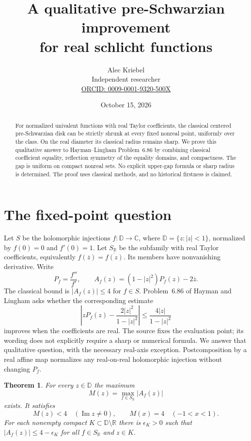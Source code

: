\documentclass[11pt]{article}
\title{A qualitative pre-Schwarzian improvement\protect\\ for real schlicht functions}
\author{Alec Kriebel\\\small Independent researcher\\
\small\href{https://orcid.org/0009-0001-9320-500X}{ORCID: 0009-0001-9320-500X}}
\date{October 15, 2026}
\newtheorem{theorem}{Theorem}
\newcommand{\D}{\mathbb D}
\newcommand{\SR}{S_{\mathbb R}}
\newcommand{\cl}[1]{\overline{#1}}
\DeclareMathOperator{\Impart}{Im}
\begin{document}
\maketitle
\begin{abstract}
For normalized univalent functions with real Taylor coefficients, the classical
centered pre-Schwarzian disk can be strictly shrunk at every fixed nonreal point,
uniformly over the class. On the real diameter its classical radius remains
sharp. We prove this qualitative answer to Hayman--Lingham Problem~6.86 by
combining classical coefficient equality, reflection symmetry of the equality
domains, and compactness. The gap is uniform on compact nonreal sets. No explicit
upper-gap formula or sharp radius is determined. The proof uses classical
methods, and no historical firstness is claimed.
\end{abstract}

\section{The fixed-point question}
Let $S$ be the holomorphic injections $f:\D\to\mathbb C$, where
$\D=\{z:|z|<1\}$, normalized by $f(0)=0$ and $f'(0)=1$.
Let $\SR$ be the subfamily with real Taylor coefficients, equivalently
$f(\cl z)=\cl{f(z)}$. Its members have nonvanishing derivative. Write
\[
 P_f=\frac{f''}{f'},\qquad
 A_f(z)=(1-|z|^2)P_f(z)-2\cl z.
\]
The classical bound is $|A_f(z)|\le4$ for $f\in S$.
Problem~6.86 of Hayman and Lingham \cite[printed pp.~114 and 147]{HL}
asks whether the corresponding estimate
\begin{equation}\label{source}
 \left|zP_f(z)-\frac{2|z|^2}{1-|z|^2}\right|
 \le \frac{4|z|}{1-|z|^2}
\end{equation}
improves when the coefficients are real. The source fixes the evaluation point;
its wording does not explicitly require a sharp or numerical formula.
We answer that qualitative question, with the necessary real-axis exception.
Postcomposition by a real affine map normalizes any real-on-real holomorphic
injection without changing $P_f$.

\begin{samepage}
\begin{theorem}\label{main}
For every $z\in\D$ the maximum
\[
 M(z)=\max_{f\in\SR}|A_f(z)|
\]
exists. It satisfies
\[
 M(z)<4\quad(\Impart z\ne0),\qquad M(x)=4\quad(-1<x<1).
\]
For each nonempty compact $K\subset\D\setminus\mathbb R$ there is
$\epsilon_K>0$ such that $|A_f(z)|\le4-\epsilon_K$ for all
$f\in\SR$ and $z\in K$.
\end{theorem}
\end{samepage}
\end{document}
